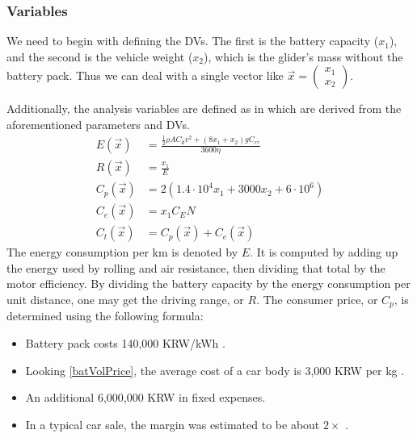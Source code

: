 \documentclass[11pt,twocolumn]{article}
\begin{document}
            \subsubsection{Variables}
                We need to begin with defining the DVs.
                The first is the battery capacity ($x_1$), and the second is the vehicle weight ($x_2$), which is the glider's mass without the battery pack.
                Thus we can deal with a single vector like $\vec{x}=\left(\begin{smallmatrix}x_1\\x_2\end{smallmatrix}\right)$.
                \par
                Additionally, the analysis variables are defined as in  which are derived from the aforementioned parameters and DVs.
                \begin{align}
                    \label{eq1begin}
                    E(\vec{x})&=\frac{\frac{1}{2}\rho AC_d v^2 +(8x_1+x_2)gC_{rr}}{3600\eta}\\
                    R(\vec{x})&=\frac{x_1}{E}\\
                    C_{p}(\vec{x})&=2(1.4\cdot 10^4 x_1 +3000x_2 +6\cdot 10^6)\\
                    C_{e}(\vec{x})&=x_1 C_E N\\
                    C_{t}(\vec{x})&=C_{p}(\vec{x})+C_{e}(\vec{x})
                    \label{eq1end}
                \end{align}
                The energy consumption per km is denoted by $E$.
                It is computed by adding up the energy used by rolling and air resistance, then dividing that total by the motor efficiency.
                By dividing the battery capacity by the energy consumption per unit distance, one may get the driving range, or $R$.
                The consumer price, or $C_{p}$, is determined using the following formula:
                \begin{itemize}
                    \item Battery pack costs 140,000 KRW/kWh \cite{140000KRW}.
                    \item Looking \cref{batVolPrice}, the average cost of a car body is 3,000 KRW per kg \cite{3000perkg}.
                    \item An additional 6,000,000 KRW in fixed expenses\cite{600additionalexpenses}.
                    \item In a typical car sale, the margin was estimated to be about $2\times$ \cite{50percentmargine}.
                \end{itemize}
\end{document}
